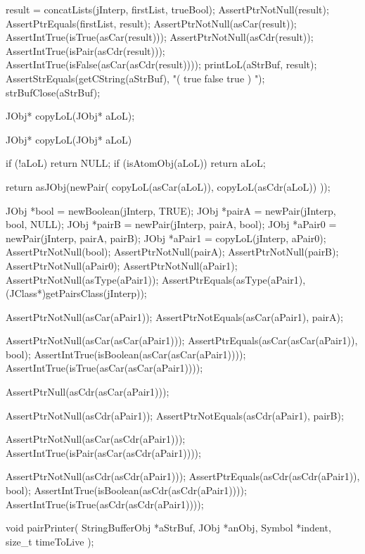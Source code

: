   result = concatLists(jInterp, firstList, trueBool);
  AssertPtrNotNull(result);
  AssertPtrEquals(firstList, result);
  AssertPtrNotNull(asCar(result));
  AssertIntTrue(isTrue(asCar(result)));
  AssertPtrNotNull(asCdr(result));
  AssertIntTrue(isPair(asCdr(result)));
  AssertIntTrue(isFalse(asCar(asCdr(result))));
  printLoL(aStrBuf, result);
  AssertStrEquals(getCString(aStrBuf), "( true false true ) ");
  strBufClose(aStrBuf);
\stopCTest
\skipTestCase
\stopTestSuite

\startTestSuite[copyLoL]

\startCHeader
JObj* copyLoL(JObj* aLoL);
\stopCHeader

\startCCode
JObj* copyLoL(JObj* aLoL) {
  if (!aLoL) return NULL;
  if (isAtomObj(aLoL)) return aLoL;

  return asJObj(newPair(
    copyLoL(asCar(aLoL)),
    copyLoL(asCdr(aLoL))
  ));
}
\stopCCode


\startCTest
  JObj *bool   = newBoolean(jInterp, TRUE);
  JObj *pairA  = newPair(jInterp, bool, NULL);
  JObj *pairB  = newPair(jInterp, pairA, bool);
  JObj *aPair0 = newPair(jInterp, pairA, pairB);
  JObj *aPair1 = copyLoL(jInterp, aPair0);
  AssertPtrNotNull(bool);
  AssertPtrNotNull(pairA);
  AssertPtrNotNull(pairB);
  AssertPtrNotNull(aPair0);
  AssertPtrNotNull(aPair1);
  AssertPtrNotNull(asType(aPair1));
  AssertPtrEquals(asType(aPair1),
    (JClass*)getPairsClass(jInterp));

  AssertPtrNotNull(asCar(aPair1));
  AssertPtrNotEquals(asCar(aPair1), pairA);

  AssertPtrNotNull(asCar(asCar(aPair1)));
  AssertPtrEquals(asCar(asCar(aPair1)), bool);
  AssertIntTrue(isBoolean(asCar(asCar(aPair1))));
  AssertIntTrue(isTrue(asCar(asCar(aPair1))));

  AssertPtrNull(asCdr(asCar(aPair1)));

  AssertPtrNotNull(asCdr(aPair1));
  AssertPtrNotEquals(asCdr(aPair1), pairB);

  AssertPtrNotNull(asCar(asCdr(aPair1)));
  AssertIntTrue(isPair(asCar(asCdr(aPair1))));

  AssertPtrNotNull(asCdr(asCdr(aPair1)));
  AssertPtrEquals(asCdr(asCdr(aPair1)), bool);
  AssertIntTrue(isBoolean(asCdr(asCdr(aPair1))));
  AssertIntTrue(isTrue(asCdr(asCdr(aPair1))));
\stopCTest
\skipTestCase
\stopTestSuite

\startTestSuite[pairPrinter]

\startCHeader
void pairPrinter(
  StringBufferObj *aStrBuf,
  JObj            *anObj,
  Symbol          *indent,
  size_t          timeToLive
);
\stopCHeader

